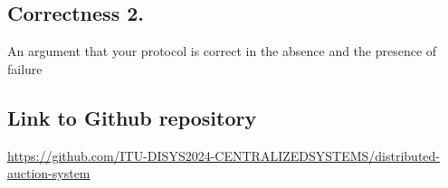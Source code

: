 \documentclass[a4paper,11pt]{article}
\begin{document}
\subsection{Correctness 2.}
An argument that your protocol is correct in the absence and the presence of failure

\newpage
\subsection*{Link to Github repository}

\href{https://github.com/ITU-DISYS2024-CENTRALIZEDSYSTEMS/distributed-auction-system}{https://github.com/ITU-DISYS2024-CENTRALIZEDSYSTEMS/distributed-auction-system}
\end{document}
